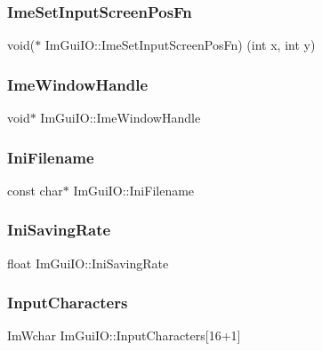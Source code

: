 \subsubsection{\texorpdfstring{Ime\+Set\+Input\+Screen\+Pos\+Fn}{ImeSetInputScreenPosFn}}
{\footnotesize\ttfamily void($\ast$ Im\+Gui\+I\+O\+::\+Ime\+Set\+Input\+Screen\+Pos\+Fn) (int x, int y)}

\hypertarget{struct_im_gui_i_o_a8baa252c4f76764eb866b920f227cfa2}{}\label{struct_im_gui_i_o_a8baa252c4f76764eb866b920f227cfa2} 
\subsubsection{\texorpdfstring{Ime\+Window\+Handle}{ImeWindowHandle}}
{\footnotesize\ttfamily void$\ast$ Im\+Gui\+I\+O\+::\+Ime\+Window\+Handle}

\hypertarget{struct_im_gui_i_o_a89e8efe8f82b539c961dc22cc2499402}{}\label{struct_im_gui_i_o_a89e8efe8f82b539c961dc22cc2499402} 
\subsubsection{\texorpdfstring{Ini\+Filename}{IniFilename}}
{\footnotesize\ttfamily const char$\ast$ Im\+Gui\+I\+O\+::\+Ini\+Filename}

\hypertarget{struct_im_gui_i_o_a9b37eea17baa240a93b1288673a6eeb9}{}\label{struct_im_gui_i_o_a9b37eea17baa240a93b1288673a6eeb9} 
\subsubsection{\texorpdfstring{Ini\+Saving\+Rate}{IniSavingRate}}
{\footnotesize\ttfamily float Im\+Gui\+I\+O\+::\+Ini\+Saving\+Rate}

\hypertarget{struct_im_gui_i_o_af6283418a2bff9db1522a6245476c7ed}{}\label{struct_im_gui_i_o_af6283418a2bff9db1522a6245476c7ed} 
\subsubsection{\texorpdfstring{Input\+Characters}{InputCharacters}}
{\footnotesize\ttfamily Im\+Wchar Im\+Gui\+I\+O\+::\+Input\+Characters\mbox{[}16+1\mbox{]}}

